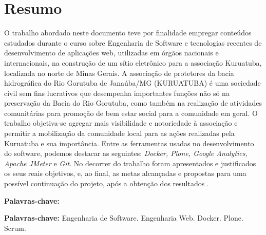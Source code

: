 \chapter*{Resumo}

\vspace{0.4cm}

\noindent O trabalho abordado neste documento teve por finalidade empregar conteúdos estudados durante o curso sobre Engenharia de Software e tecnologias recentes de desenvolvimento de aplicações web, utilizadas em órgãos nacionais e internacionais, na construção de um sítio eletrônico para a associação Kuruatuba, localizada no norte de Minas Gerais. A associação de protetores da bacia hidrográfica do Rio Gorutuba de Janaúba/MG (KURUATUBA) é uma sociedade civil sem fins lucrativos que desempenha importantes funções não só na preservação da Bacia do Rio Gorutuba, como também na realização de atividades comunitárias para promoção de bem estar social para a comunidade em geral. O trabalho objetiva-se agregar mais visibilidade e notoriedade à associação e permitir a mobilização da comunidade local para as ações realizadas pela Kuruatuba e sua importância.   
Entre as ferramentas usadas no desenvolvimento do software, podemos destacar as seguintes: \textit{Docker, Plone, Google Analytics, Apache JMeter} e \textit{Git}.  
No decorrer do trabalho foram apresentados e justificados os seus reais objetivos, e, ao final, as metas alcançadas e propostas para uma possível continuação do projeto, após a obtenção dos resultados .

\begin{labeling}{\textbf{Palavras-chave:}}
\item[\textbf{Palavras-chave:}] 
Engenharia de Software.
Engenharia Web.
Docker.
Plone.
Scrum.
\end{labeling}


